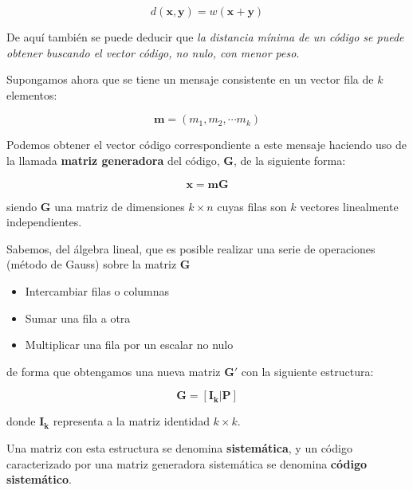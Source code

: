 \documentclass[es,apuntes]{uah}
\begin{document}
\begin{displaymath}
	d(\mathbf{x},\mathbf{y}) = w(\mathbf{x} + \mathbf{y})
\end{displaymath}

De aquí también se puede deducir que \textit{la distancia mínima de un código se puede obtener buscando el vector código, no nulo, con menor peso}. 

Supongamos ahora que se tiene un mensaje consistente en un vector fila de $k$ elementos: 

\begin{displaymath}
	\mathbf{m} = (m_1, m_2, \cdots m_k)
\end{displaymath}

Podemos obtener el vector código correspondiente a este mensaje haciendo uso de la llamada {\bf matriz generadora} del código, $\mathbf{G}$, de la siguiente forma:

\begin{displaymath}
	\mathbf{x} = \mathbf{m} \mathbf{G}
\end{displaymath}

siendo $\mathbf{G}$ una matriz de dimensiones $k \times n$ cuyas filas son $k$ vectores linealmente independientes. 

Sabemos, del álgebra lineal, que es posible realizar una serie de operaciones (método de Gauss) sobre la matriz $\mathbf{G}$

\begin{itemize}
	\item Intercambiar filas o columnas
	\item Sumar una fila a otra
	\item Multiplicar una fila por un escalar no nulo
\end{itemize}

de forma que obtengamos una nueva matriz $\mathbf{G}'$ con la siguiente estructura:

\begin{displaymath}
	\mathbf{G} = [\mathbf{I_k} | \mathbf{P} ]
\end{displaymath}

donde $\mathbf{I_k}$ representa a la matriz identidad $k \times k$.

Una matriz con esta estructura se denomina {\bf sistemática}, y un código caracterizado por una matriz generadora sistemática se denomina {\bf código sistemático}.
\end{document}
